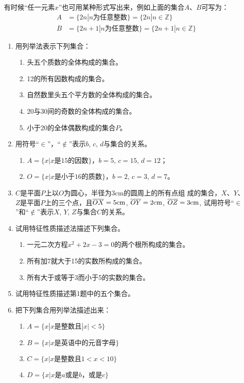 有时候“任一元素$x$”也可用某种形式写出来，例如上面的集合$A$、$B$可写为：
\[\begin{split}
	A&=\{2n|n\text{为任意整数}\}=\{2n|n\in\mathbb{Z}\}\\
	B&=\{2n+1|n\text{为任意整数}\}=\{2n+1|n\in\mathbb{Z}\}
\end{split}\]

\begin{ex}
	\begin{enumerate}
		\item 用列举法表示下列集合：
		\begin{enumerate}
			\item 头五个质数的全体构成的集合。
			\item 12的所有因数构成的集合。
			\item 自然数里头五个平方数的全体构成的集合。
			\item 20与30间的奇数的全体构成的集合。
			\item 小于20的全体偶数构成的集合$P$。
		\end{enumerate}
		
		\item 用符号“$\in$”，“$\notin$”表示$b$, $c$, $d$与集合的关系。
		\begin{enumerate}
			\item $A=\{x|x\text{是15的因数}\}$，$b=5$, $c=15$, $d=12$；
			\item $O=\{x|x\text{是小于16的质数}\}$，$b=2$, $c=3$, $d=7$。
		\end{enumerate}
		
		\item $C$是平面$P$上以$O$为圆心，半径为3cm的圆周上的所有点组
		成的集合，$X$、$Y$、$Z$是平面$P$上的三个点，且$\overline{OX}=5{\rm cm}$, $\overline{OY}=2{\rm  cm}$, $\overline{OZ}=3{\rm cm}$, 试用符号“$\in$”和“$\notin$”表示$X$,
		$Y$, $Z$与集合$C$的关系。
		
		\item 试用特征性质描述法描述下列集合。
		\begin{enumerate}
			\item 一元二次方程$x^2+2x-3=0$的两个根所构成的集合。
			\item 所有加7就大于15的实数所构成的集合。
			\item 所有大于或等于3而小于5的实数的集合。
		\end{enumerate}
		
		\item 试用特征性质描述第1题中的五个集合。
		
		\item 把下列集合用列举法描述出来：
		\begin{enumerate}
			\item $A=\{x|x\text{是整数且}|x|<5\}$
			\item $B=\{x|x\text{是英语中的元音字母}\}$
			\item $C=\{x|x\text{是整数且}1<x<10  \}$
			\item $D=\{x|x\text{是$a$或是$b$，或是$c$}\}$
		\end{enumerate}
	\end{enumerate} 
\end{ex}


